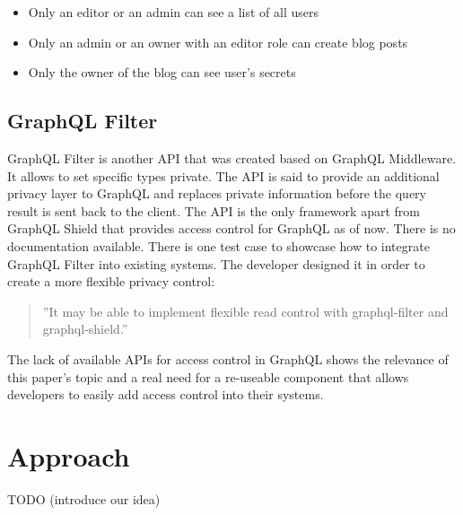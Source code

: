\documentclass[conference]{IEEEtran}
\begin{document}
\begin{itemize}
    \item Only an editor or an admin can see a list of all users
    \item Only an admin or an owner with an editor role can create blog posts
    \item Only the owner of the blog can see user's secrets
\end{itemize}


\subsection{GraphQL Filter}\label{filter}

GraphQL Filter is another API that was created based on GraphQL Middleware. It allows to set specific types private. The API is said to provide an additional privacy layer to GraphQL and replaces private information before the query result is sent back to the client. The API is the only framework apart from GraphQL Shield that provides access control for GraphQL as of now. There is no documentation available. There is one test case to showcase how to integrate GraphQL Filter into existing systems. The developer designed it in order to create a more flexible privacy control:\newline

 \begin{quote} ''It may be able to implement flexible read control with graphql-filter and graphql-shield.'' \cite{b2}\newline
 \end{quote}

The lack of available APIs for access control in GraphQL shows the relevance of this paper's topic and a real need for a re-useable component that allows developers to easily add access control into their systems.

\section{Approach}\label{approach}

TODO (introduce our idea)
\end{document}
